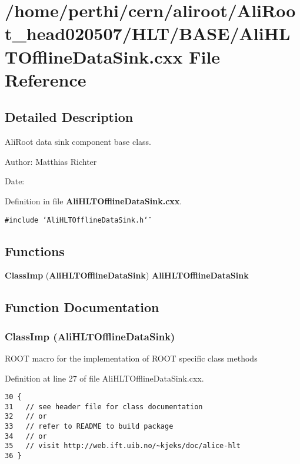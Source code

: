 \section{/home/perthi/cern/aliroot/Ali\-Root\_\-head020507/HLT/BASE/Ali\-HLTOffline\-Data\-Sink.cxx File Reference}
\label{AliHLTOfflineDataSink_8cxx}


\subsection{Detailed Description}
Ali\-Root data sink component base class. 

\begin{Desc}
\item[Author:]Matthias Richter \end{Desc}
\begin{Desc}
\item[Date:]\end{Desc}


Definition in file {\bf Ali\-HLTOffline\-Data\-Sink.cxx}.

{\tt \#include \char`\"{}Ali\-HLTOffline\-Data\-Sink.h\char`\"{}}\par
\subsection*{Functions}
\begin{CompactItemize}
\item 
{\bf Class\-Imp} ({\bf Ali\-HLTOffline\-Data\-Sink}) {\bf Ali\-HLTOffline\-Data\-Sink}
\end{CompactItemize}


\subsection{Function Documentation}
\subsubsection{\setlength{\rightskip}{0pt plus 5cm}Class\-Imp ({\bf Ali\-HLTOffline\-Data\-Sink})}\label{AliHLTOfflineDataSink_8cxx_a0}


ROOT macro for the implementation of ROOT specific class methods 

Definition at line 27 of file Ali\-HLTOffline\-Data\-Sink.cxx.

\footnotesize\begin{verbatim}30 {
31   // see header file for class documentation
32   // or
33   // refer to README to build package
34   // or
35   // visit http://web.ift.uib.no/~kjeks/doc/alice-hlt
36 }
\end{verbatim}\normalsize 


